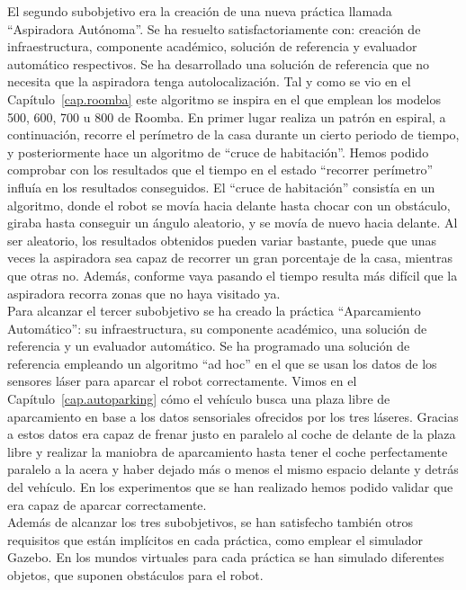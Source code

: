 El segundo subobjetivo era la creación de una nueva práctica llamada ``Aspiradora Autónoma''. Se ha resuelto satisfactoriamente con: creación de infraestructura, componente académico, solución de referencia y evaluador automático respectivos. Se ha desarrollado una solución de referencia que no necesita que la aspiradora tenga autolocalización. Tal y como se vio en el Capítulo~\ref{cap.roomba} este algoritmo se inspira en el que emplean los modelos 500, 600, 700 u 800 de Roomba. En primer lugar realiza un patrón en espiral, a continuación, recorre el perímetro de la casa durante un cierto periodo de tiempo, y posteriormente hace un algoritmo de ``cruce de habitación''. Hemos podido comprobar con los resultados que el tiempo en el estado ``recorrer perímetro'' influía en los resultados conseguidos. El ``cruce de habitación'' consistía en un algoritmo, donde el robot se movía hacia delante hasta chocar con un obstáculo, giraba hasta conseguir un ángulo aleatorio, y se movía de nuevo hacia delante. Al ser aleatorio, los resultados obtenidos pueden variar bastante, puede que unas veces la aspiradora sea capaz de recorrer un gran porcentaje de la casa, mientras que otras no. Además, conforme vaya pasando el tiempo resulta más difícil que la aspiradora recorra zonas que no haya visitado ya.\\

Para alcanzar el tercer subobjetivo se ha creado la práctica ``Aparcamiento Automático'': su infraestructura, su componente académico, una solución de referencia y un evaluador automático. Se ha programado una solución de referencia empleando un algoritmo ``ad hoc'' en el que se usan los datos de los sensores láser para aparcar el robot correctamente. Vimos en el Capítulo~\ref{cap.autoparking} cómo el vehículo busca una plaza libre de aparcamiento en base a los datos sensoriales ofrecidos por los tres láseres. Gracias a estos datos era capaz de frenar justo en paralelo al coche de delante de la plaza libre y realizar la maniobra de aparcamiento hasta tener el coche perfectamente paralelo a la acera y haber dejado más o menos el mismo espacio delante y detrás del vehículo. En los experimentos que se han realizado hemos podido validar que era capaz de aparcar correctamente.\\

Además de alcanzar los tres subobjetivos, se han satisfecho también otros requisitos que están implícitos en cada práctica, como emplear el simulador Gazebo. En los mundos virtuales para cada práctica se han simulado diferentes objetos, que suponen obstáculos para el robot.\\

